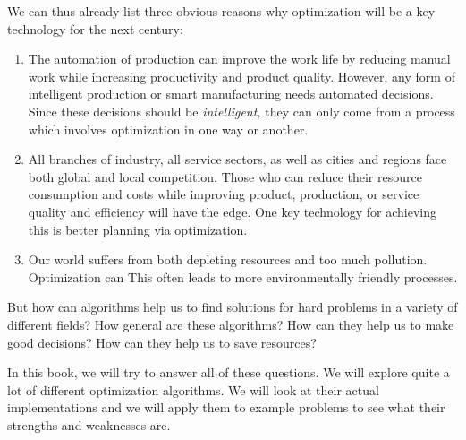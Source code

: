 We can thus already list three obvious reasons why optimization will be a key technology for the next century:%
%
\begin{enumerate}%
%
\item The automation of production can improve the work life by reducing manual work while increasing productivity and product quality.
However, any form of intelligent production or smart manufacturing needs automated decisions.
Since these decisions should be \emph{intelligent,} they can only come from a process which involves optimization in one way or another.%
%
\item All branches of industry, all service sectors, as well as cities and regions face both global and local competition.
Those who can reduce their resource consumption and costs while improving product, production, or service quality and efficiency will have the edge.
One key technology for achieving this is better planning via optimization.%
%
\item Our world suffers from both depleting resources and too much pollution.
Optimization can 
This often leads to more environmentally friendly processes.%
%
\end{enumerate}%
%
But how can algorithms help us to find solutions for hard problems in a variety of different fields?
How general are these algorithms?
How can they help us to make good decisions?
How can they help us to save resources?

In this book, we will try to answer all of these questions.
We will explore quite a lot of different optimization algorithms.
We will look at their actual implementations and we will apply them to example problems to see what their strengths and weaknesses are.%
%
%
%
%
\endhsection\endhsection%
%
